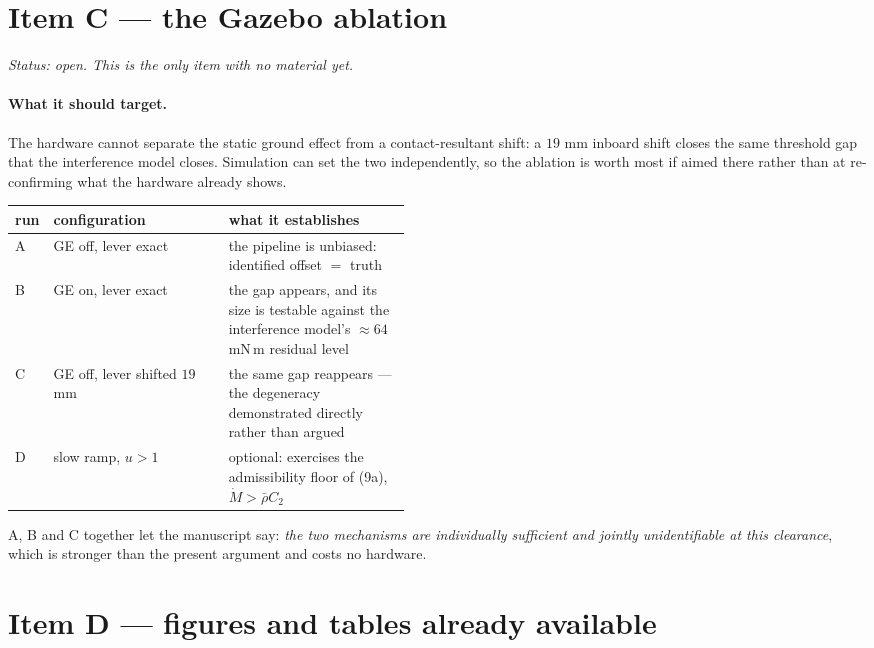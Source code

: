 \documentclass[10pt]{article}
\begin{document}
\section{Item C --- the Gazebo ablation}

\emph{Status: open. This is the only item with no material yet.}

\paragraph{What it should target.} The hardware cannot separate the
static ground effect from a contact-resultant shift: a $19$ mm inboard
shift closes the same threshold gap that the interference model
closes. Simulation can set the two independently, so the ablation is
worth most if aimed there rather than at re-confirming what the
hardware already shows.

\begin{center}\small
\begin{tabular}{@{}llp{0.46\linewidth}@{}}
\toprule
run & configuration & what it establishes\\
\midrule
A & GE off, lever exact &
  the pipeline is unbiased: identified offset $=$ truth\\
B & GE on, lever exact &
  the gap appears, and its size is testable against the
  interference model's $\approx 64$ mN\,m residual level\\
C & GE off, lever shifted $19$ mm &
  the same gap reappears --- the degeneracy demonstrated
  directly rather than argued\\
\addlinespace
D & slow ramp, $u>1$ &
  optional: exercises the admissibility floor of (9a),
  $\dot M > \bar\rho C_2$\\
\bottomrule
\end{tabular}
\end{center}

A, B and C together let the manuscript say: \emph{the two mechanisms
are individually sufficient and jointly unidentifiable at this
clearance}, which is stronger than the present argument and costs no
hardware.

\section{Item D --- figures and tables already available}
\end{document}
